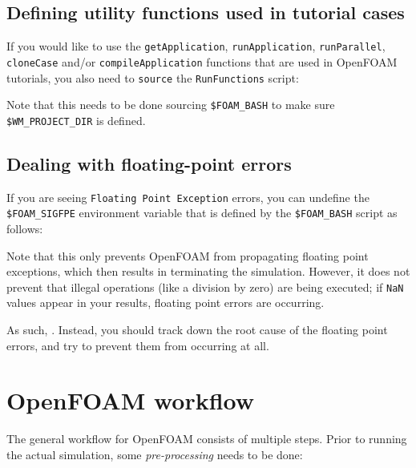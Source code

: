 \subsection{Defining utility functions used in tutorial cases}

If you would like to use the \lstinline|getApplication|, \lstinline|runApplication|,
\lstinline|runParallel|, \lstinline|cloneCase| and/or \lstinline|compileApplication| functions that are
used in OpenFOAM tutorials, you also need to \lstinline|source| the \lstinline|RunFunctions| script:

\begin{prompt}
\end{prompt}

Note that this needs to be done  sourcing \lstinline|$FOAM_BASH| to make sure
\lstinline|$WM_PROJECT_DIR| is defined.

\subsection{Dealing with floating-point errors}

If you are seeing \lstinline|Floating Point Exception| errors, you can undefine the
\lstinline|$FOAM_SIGFPE| environment variable that is defined by the \lstinline|$FOAM_BASH| script
as follows:

\begin{prompt}
\end{prompt}

Note that this only prevents OpenFOAM from propagating floating point exceptions, which then results in
terminating the simulation. However, it does not prevent that illegal operations (like a division by zero)
are being executed; if \lstinline|NaN| values appear in your results, floating point errors are occurring.

As such, . Instead, you should track down the root cause
of the floating point errors, and try to prevent them from occurring at all.

\section{OpenFOAM workflow}
The general workflow for OpenFOAM consists of multiple steps.
Prior to running the actual simulation, some \emph{pre-processing} needs to be done:

